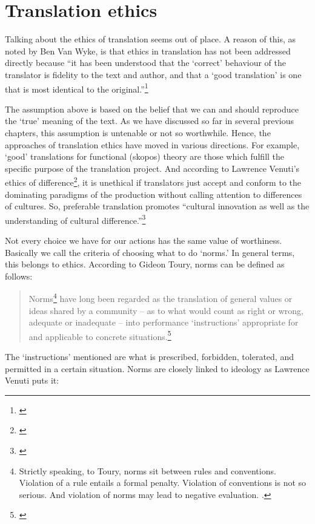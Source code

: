 \chapter{Translation ethics}\label{chap:ethics}

Talking about the ethics of translation seems out of place. A reason of this, as noted by Ben Van Wyke, is that ethics in translation has not been addressed directly because ``it has been understood that the `correct' behaviour of the translator is fidelity to the text and author, and that a `good translation' is one that is most identical to the original.''\footnote{\citealp[p.~548]{wyke:ethics}}

The assumption above is based on the belief that we can and should reproduce the `true' meaning of the text. As we have discussed so far in several previous chapters, this assumption is untenable or not so worthwhile. Hence, the approaches of translation ethics have moved in various directions. For example, `good' translations for functional (skopos) theory are those which fulfill the specific purpose of the translation project. And according to Lawrence Venuti's ethics of difference\footnote{\citealp{venuti:scandals}}, it is unethical if translators just accept and conform to the dominating paradigms of the production without calling attention to differences of cultures. So, preferable translation promotes ``cultural innovation as well as the understanding of cultural difference.''\footnote{\citealp[p.~11]{venuti:scandals}}

Not every choice we have for our actions has the same value of worthiness. Basically we call the criteria of choosing what to do `norms.' In general terms, this belongs to ethics. According to Gideon Toury, norms can be defined as follows:

\begin{quote}
Norms\footnote{Strictly speaking, to Toury, norms sit between rules and conventions. Violation of a rule entails a formal penalty. Violation of conventions is not so serious. And violation of norms may lead to negative evaluation. \citealp[See][p.~177]{munday:translation}.} have long been regarded as the translation of general values or ideas shared by a community -- as to what would count as right or wrong, adequate or inadequate -- into performance `instructions' appropriate for and applicable to concrete situations.\footnote{\citealp[p.~63]{toury:descriptive}}
\end{quote}

The `instructions' mentioned are what is prescribed, forbidden, tolerated, and permitted in a certain situation. Norms are closely linked to ideology as Lawrence Venuti puts it:

